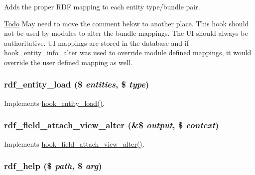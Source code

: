Adds the proper RDF mapping to each entity type/bundle pair.

\begin{Desc}
\item[\hyperlink{todo__todo000019}{Todo}]May need to move the comment below to another place. This hook should not be used by modules to alter the bundle mappings. The UI should always be authoritative. UI mappings are stored in the database and if hook\_\-entity\_\-info\_\-alter was used to override module defined mappings, it would override the user defined mapping as well. \end{Desc}
\hypertarget{rdf_8module_a4def1bc6dc5210a6216c13493140c096}{
\subsubsection[{rdf\_\-entity\_\-load}]{\setlength{\rightskip}{0pt plus 5cm}rdf\_\-entity\_\-load (\$ {\em entities}, \/  \$ {\em type})}}
\label{rdf_8module_a4def1bc6dc5210a6216c13493140c096}
Implements \hyperlink{group__hooks_ga1f594647c8cbb27f75b77cc4118da8d6}{hook\_\-entity\_\-load()}. \hypertarget{rdf_8module_ab7112f10957a10089be7652414648ada}{
\subsubsection[{rdf\_\-field\_\-attach\_\-view\_\-alter}]{\setlength{\rightskip}{0pt plus 5cm}rdf\_\-field\_\-attach\_\-view\_\-alter (\&\$ {\em output}, \/  \$ {\em context})}}
\label{rdf_8module_ab7112f10957a10089be7652414648ada}
Implements \hyperlink{group__field__attach_ga0c415aacfd70903f556fb67517dfe1ee}{hook\_\-field\_\-attach\_\-view\_\-alter()}. \hypertarget{rdf_8module_a8940fb807d1b3e212e4b534e7ee3259a}{
\subsubsection[{rdf\_\-help}]{\setlength{\rightskip}{0pt plus 5cm}rdf\_\-help (\$ {\em path}, \/  \$ {\em arg})}}
\label{rdf_8module_a8940fb807d1b3e212e4b534e7ee3259a}
